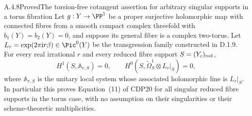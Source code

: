 \begin{statement}{A.4.8}{Proved}{The torsion-free cotangent assertion for arbitrary singular supports in a torus fibration}
Let $g:Y\to\PP^1$ be a proper surjective holomorphic map with connected fibres from a smooth compact complex threefold with $b_1(Y)=b_2(Y)=0$, and suppose its general fibre is a complex two-torus. Let $L_r=\exp(2\pi\mathrm i r\beta)\in\Pic^0(Y)$ be the transgression family constructed in D.1.9. For every real irrational $r$ and every reduced fibre support $S=(Y_c)_{\rm red}$,
\[
 H^1(S,\mathbb A_{r,S})=0,
 \qquad
 H^0(S,\widetilde\Omega_S^1\otimes L_r|_S)=0,
 \tag{A.21}
\]
where $\mathbb A_{r,S}$ is the unitary local system whose associated holomorphic line is $L_r|_S$. In particular this proves Equation~(11) of CDP20 for all singular reduced fibre supports in the torus case, with no assumption on their singularities or their scheme-theoretic multiplicities.
\end{statement}
